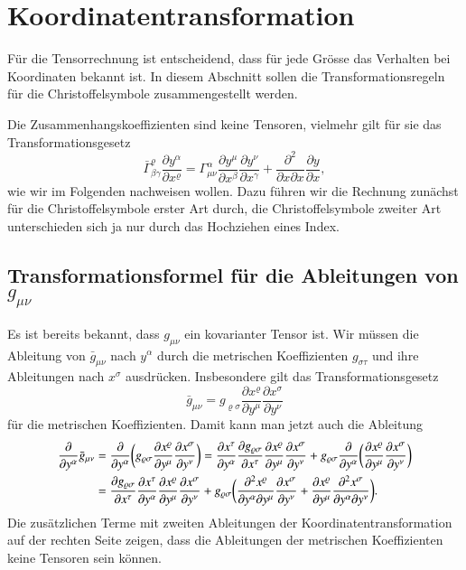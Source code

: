 %
%
%
\section{Koordinatentransformation}
Für die Tensorrechnung ist entscheidend, dass für jede Grösse das Verhalten
bei Koordinaten bekannt ist.
In diesem Abschnitt sollen die Transformationsregeln für die
Christoffelsymbole zusammengestellt werden.

Die Zusammenhangskoeffizienten sind keine Tensoren, vielmehr gilt für sie das
Transformationsgesetz
\[
\bar\Gamma^\varrho_{\beta\gamma}
\frac{\partial y^\alpha}{\partial x^\varrho}
=
\Gamma^\alpha_{\mu\nu}
\frac{\partial y^\mu}{\partial x^\beta}
\frac{\partial y^\nu}{\partial x^\gamma}
+
\frac{\partial^2}{\partial x\partial x}
\frac{\partial y}{\partial x},
\]
wie wir im Folgenden nachweisen wollen.
Dazu führen wir die Rechnung zunächst für die Christoffelsymbole
erster Art durch, die Christoffelsymbole zweiter Art unterschieden sich
ja nur durch das Hochziehen eines Index.

\subsection{Transformationsformel für die Ableitungen von $g_{\mu\nu}$}
Es ist bereits bekannt, dass $g_{\mu\nu}$ ein kovarianter Tensor ist.
Wir müssen die Ableitung von $\bar g_{\mu\nu}$ nach $y^\alpha$ durch
die metrischen Koeffizienten $g_{\sigma\tau}$ und ihre Ableitungen
nach $x^\sigma$ ausdrücken.
Insbesondere gilt das Transformationsgesetz
\begin{equation*}
\bar g_{\mu\nu}
=
g_{\varrho\sigma}
\frac{\partial x^\varrho}{\partial y^\mu}
\frac{\partial x^\sigma}{\partial y^\nu}
\end{equation*}
für die metrischen Koeffizienten. 
Damit kann man jetzt auch die Ableitung 
\begin{align}
\frac{\partial}{\partial y^\alpha}\bar g_{\mu\nu}
&=
\frac{\partial}{\partial y^\alpha} 
\biggl(
g_{\varrho\sigma}
\frac{\partial x^\varrho}{\partial y^\mu}
\frac{\partial x^\sigma}{\partial y^\nu}
\biggr)
=
\frac{\partial x^\tau}{\partial y^\alpha}
\frac{\partial g_{\varrho\sigma} }{\partial x^\tau}
\frac{\partial x^\varrho}{\partial y^\mu}
\frac{\partial x^\sigma}{\partial y^\nu}
+
g_{\varrho\sigma}
\frac{\partial}{\partial y^\alpha} 
\biggl(
\frac{\partial x^\varrho}{\partial y^\mu}
\frac{\partial x^\sigma}{\partial y^\nu}
\biggr)
\notag
\\
&=
\frac{\partial g_{\varrho\sigma}}{\partial x^\tau}
\frac{\partial x^\tau}{\partial y^\alpha}
\frac{\partial x^\varrho}{\partial y^\mu}
\frac{\partial x^\sigma}{\partial y^\nu}
+
g_{\varrho\sigma}
\biggl(
\frac{\partial^2 x^\varrho}{\partial y^\alpha\partial y^\mu}
\frac{\partial x^\sigma}{\partial y^\nu}
+
\frac{\partial x^\varrho}{\partial y^\mu}
\frac{\partial^2 x^\sigma}{\partial y^\alpha\partial y^\nu}
\biggr).
\label{skript:trafo:gabl}
\end{align}
Die zusätzlichen Terme mit zweiten Ableitungen der Koordinatentransformation
auf der rechten Seite zeigen, dass die Ableitungen der metrischen Koeffizienten
keine Tensoren sein können.

